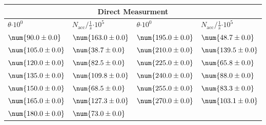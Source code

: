\begin{tabular}{|p{}|p{}||p{}|p{}|}
\hline
\multicolumn{4}{|c|}{Direct Measurment}\\
\hline
$\theta$$\cdot 10^{0}$&$N_\text{acc}/\frac{1}{s}$$\cdot 10^{5}$&$\theta$$\cdot 10^{0}$&$N_\text{acc}/\frac{1}{s}$$\cdot 10^{5}$\\
\hline
$\num{90.0\pm 0.0}$&$\num{163.0\pm 0.0}$&$\num{195.0\pm 0.0}$&$\num{48.7\pm 0.0}$\\
$\num{105.0\pm 0.0}$&$\num{38.7\pm 0.0}$&$\num{210.0\pm 0.0}$&$\num{139.5\pm 0.0}$\\
$\num{120.0\pm 0.0}$&$\num{82.5\pm 0.0}$&$\num{225.0\pm 0.0}$&$\num{65.8\pm 0.0}$\\
$\num{135.0\pm 0.0}$&$\num{109.8\pm 0.0}$&$\num{240.0\pm 0.0}$&$\num{88.0\pm 0.0}$\\
$\num{150.0\pm 0.0}$&$\num{68.5\pm 0.0}$&$\num{255.0\pm 0.0}$&$\num{83.3\pm 0.0}$\\
$\num{165.0\pm 0.0}$&$\num{127.3\pm 0.0}$&$\num{270.0\pm 0.0}$&$\num{103.1\pm 0.0}$\\
$\num{180.0\pm 0.0}$&$\num{73.0\pm 0.0}$&&\\
\hline
\end{tabular}